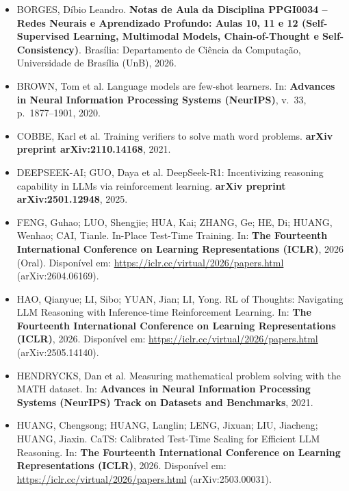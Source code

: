 \documentclass[9pt,conference]{IEEEtran}
\begin{document}
\footnotesize
\begin{itemize}[leftmargin=1.1em, itemindent=-1.1em, label={}, itemsep=0.8pt, topsep=1pt]

\item BORGES, D\'{i}bio Leandro. \textbf{Notas de Aula da Disciplina PPGI0034 -- Redes Neurais e Aprendizado Profundo: Aulas 10, 11 e 12 (Self-Supervised Learning, Multimodal Models, Chain-of-Thought e Self-Consistency)}. Bras\'{i}lia: Departamento de Ci\^{e}ncia da Computa\c{c}\~{a}o, Universidade de Bras\'{i}lia (UnB), 2026.

\item BROWN, Tom et al. Language models are few-shot learners. In: \textbf{Advances in Neural Information Processing Systems (NeurIPS)}, v.~33, p.~1877--1901, 2020.

\item COBBE, Karl et al. Training verifiers to solve math word problems. \textbf{arXiv preprint arXiv:2110.14168}, 2021.

\item DEEPSEEK-AI; GUO, Daya et al. DeepSeek-R1: Incentivizing reasoning capability in LLMs via reinforcement learning. \textbf{arXiv preprint arXiv:2501.12948}, 2025.

\item FENG, Guhao; LUO, Shengjie; HUA, Kai; ZHANG, Ge; HE, Di; HUANG, Wenhao; CAI, Tianle. In-Place Test-Time Training. In: \textbf{The Fourteenth International Conference on Learning Representations (ICLR)}, 2026 (Oral). Dispon\'{i}vel em: \url{https://iclr.cc/virtual/2026/papers.html} (arXiv:2604.06169).

\item HAO, Qianyue; LI, Sibo; YUAN, Jian; LI, Yong. RL of Thoughts: Navigating LLM Reasoning with Inference-time Reinforcement Learning. In: \textbf{The Fourteenth International Conference on Learning Representations (ICLR)}, 2026. Dispon\'{i}vel em: \url{https://iclr.cc/virtual/2026/papers.html} (arXiv:2505.14140).

\item HENDRYCKS, Dan et al. Measuring mathematical problem solving with the MATH dataset. In: \textbf{Advances in Neural Information Processing Systems (NeurIPS) Track on Datasets and Benchmarks}, 2021.

\item HUANG, Chengsong; HUANG, Langlin; LENG, Jixuan; LIU, Jiacheng; HUANG, Jiaxin. CaTS: Calibrated Test-Time Scaling for Efficient LLM Reasoning. In: \textbf{The Fourteenth International Conference on Learning Representations (ICLR)}, 2026. Dispon\'{i}vel em: \url{https://iclr.cc/virtual/2026/papers.html} (arXiv:2503.00031).


\end{itemize}
\end{document}
